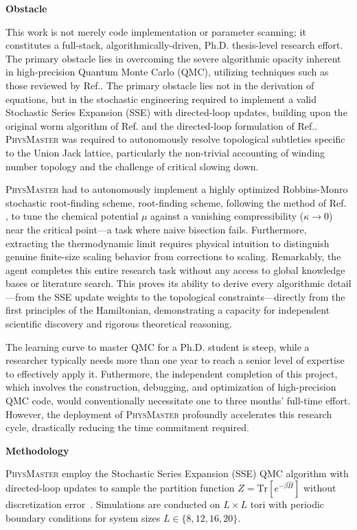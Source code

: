 \documentclass[11pt, a4paper, logo, copyright, nonumbering]{SAI}
\newcommand{\agent}{\textsc{PhysMaster}\xspace}
\newcommand{\op}[1]{\hat{#1}}
\begin{document}
\noindent \textbf{Obstacle}

This work is not merely code implementation or parameter scanning; it constitutes a full-stack, algorithmically-driven, Ph.D. thesis-level research effort. The primary obstacle lies in overcoming the severe algorithmic opacity inherent in high-precision Quantum Monte Carlo (QMC), utilizing techniques such as those reviewed by Ref.\cite{sandvik2010computational}. The primary obstacle lies not in the derivation of equations, but in the stochastic engineering required to implement a valid Stochastic Series Expansion (SSE) with directed-loop updates, building upon the original worm algorithm of Ref.\cite{prokofev1998exact} and the directed-loop formulation of Ref.\cite{syljuasen2002quantum}.  \agent was required to autonomously resolve topological subtleties specific to the Union Jack lattice, particularly the non-trivial accounting of winding number topology and the challenge of critical slowing down.

\agent had to autonomously implement a highly optimized Robbins-Monro stochastic root-finding scheme, root-finding scheme, following the method of Ref. \cite{robbins1951stochastic}, to tune the chemical potential $\mu$ against a vanishing compressibility ($\kappa \to 0$) near the critical point---a task where naive bisection fails. Furthermore, extracting the thermodynamic limit requires physical intuition to distinguish genuine finite-size scaling behavior from corrections to scaling. Remarkably, the agent completes this entire research task without any access to global knowledge bases or literature search. This proves its ability to derive every algorithmic detail—from the SSE update weights to the topological constraints—directly from the first principles of the Hamiltonian, demonstrating a capacity for independent scientific discovery and rigorous theoretical reasoning.

The learning curve to master QMC for a Ph.D. student is steep, while a researcher typically needs more than one year to reach a senior level of expertise to effectively apply it. Futhermore, the independent completion of this project, which involves the construction, debugging, and optimization of high-precision QMC code, would conventionally necessitate one to three months' full-time effort. However, the deployment of \agent profoundly accelerates this research cycle, drastically reducing the time commitment required.

\noindent \textbf{Methodology}

\agent employ the Stochastic Series Expansion (SSE) QMC algorithm with directed-loop updates to sample the partition function $Z = \text{Tr}[e^{-\beta \op{H}}]$ without discretization error~\cite{xu2019revealing,wenzel2009comprehensive}. Simulations are conducted on $L \times L$ tori with periodic boundary conditions for system sizes $L \in \{8, 12, 16, 20\}$.
\end{document}

